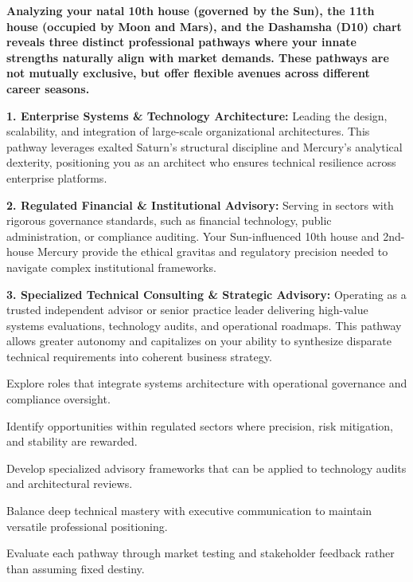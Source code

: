 {\fontsize{9.5}{13.8}\selectfont\bfseries\color{DeepSlate} Analyzing your natal 10th house (governed by the Sun), the 11th house (occupied by Moon and Mars), and the Dashamsha (D10) chart reveals three distinct professional pathways where your innate strengths naturally align with market demands. These pathways are not mutually exclusive, but offer flexible avenues across different career seasons.}\par\vspace{2mm}

{\fontsize{9}{13}\selectfont \textbf{1. Enterprise Systems \& Technology Architecture:} Leading the design, scalability, and integration of large-scale organizational architectures. This pathway leverages exalted Saturn's structural discipline and Mercury's analytical dexterity, positioning you as an architect who ensures technical resilience across enterprise platforms.}\par\vspace{1.8mm}

{\fontsize{9}{13}\selectfont \textbf{2. Regulated Financial \& Institutional Advisory:} Serving in sectors with rigorous governance standards, such as financial technology, public administration, or compliance auditing. Your Sun-influenced 10th house and 2nd-house Mercury provide the ethical gravitas and regulatory precision needed to navigate complex institutional frameworks.}\par\vspace{1.8mm}

{\fontsize{9}{13}\selectfont \textbf{3. Specialized Technical Consulting \& Strategic Advisory:} Operating as a trusted independent advisor or senior practice leader delivering high-value systems evaluations, technology audits, and operational roadmaps. This pathway allows greater autonomy and capitalizes on your ability to synthesize disparate technical requirements into coherent business strategy.}\par\vspace{1.8mm}

\begin{diamondlist}
  \item {\fontsize{8.5}{12}\selectfont Explore roles that integrate systems architecture with operational governance and compliance oversight.}
  \item {\fontsize{8.5}{12}\selectfont Identify opportunities within regulated sectors where precision, risk mitigation, and stability are rewarded.}
  \item {\fontsize{8.5}{12}\selectfont Develop specialized advisory frameworks that can be applied to technology audits and architectural reviews.}
  \item {\fontsize{8.5}{12}\selectfont Balance deep technical mastery with executive communication to maintain versatile professional positioning.}
  \item {\fontsize{8.5}{12}\selectfont Evaluate each pathway through market testing and stakeholder feedback rather than assuming fixed destiny.}
\end{diamondlist}

